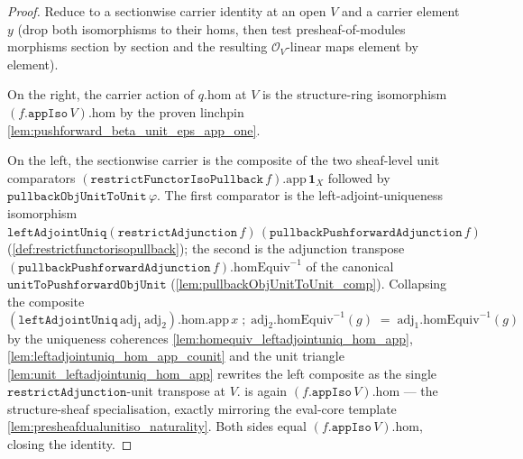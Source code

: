 \begin{proof}
  \leanok
  Reduce to a sectionwise carrier identity at an open \(V\) and a carrier element \(y\) (drop both
  isomorphisms to their homs, then test presheaf-of-modules morphisms section by section and the
  resulting \(\mathcal{O}_V\)-linear maps element by element).

  On the right, the carrier action of \(q.\mathrm{hom}\) at \(V\) is the structure-ring isomorphism
  \((f.\mathtt{appIso}\,V).\mathrm{hom}\) by the proven linchpin
  \cref{lem:pushforward_beta_unit_eps_app_one}.

  On the left, the sectionwise carrier is the composite of the two sheaf-level unit comparators
  \((\mathtt{restrictFunctorIsoPullback}\,f).\mathrm{app}\,\mathbf 1_X\) followed by
  \(\mathtt{pullbackObjUnitToUnit}\,\varphi\). The first comparator is the left-adjoint-uniqueness
  isomorphism \(\mathtt{leftAdjointUniq}(\mathtt{restrictAdjunction}\,f)\,
  (\mathtt{pullbackPushforwardAdjunction}\,f)\) (\cref{def:restrictfunctorisopullback}); the second is
  the adjunction transpose \((\mathtt{pullbackPushforwardAdjunction}\,f).\mathrm{homEquiv}^{-1}\) of
  the canonical \(\mathtt{unitToPushforwardObjUnit}\) (\cref{lem:pullbackObjUnitToUnit_comp}).
  Collapsing the composite
  \[
    (\mathtt{leftAdjointUniq}\,\mathrm{adj}_1\,\mathrm{adj}_2).\mathrm{hom}.\mathrm{app}\,x
      \;\mathbin{;}\; \mathrm{adj}_2.\mathrm{homEquiv}^{-1}(g)
      \;=\; \mathrm{adj}_1.\mathrm{homEquiv}^{-1}(g)
  \]
  by the uniqueness coherences \cref{lem:homequiv_leftadjointuniq_hom_app},
  \cref{lem:leftadjointuniq_hom_app_counit} and the unit triangle
  \cref{lem:unit_leftadjointuniq_hom_app} rewrites the left composite as the single
  \(\mathtt{restrictAdjunction}\)-unit transpose at \(V\).
  is again \((f.\mathtt{appIso}\,V).\mathrm{hom}\) --- the structure-sheaf specialisation, exactly
  mirroring the eval-core template \cref{lem:presheafdualunitiso_naturality}. Both sides equal
  \((f.\mathtt{appIso}\,V).\mathrm{hom}\), closing the identity.
\end{proof}

